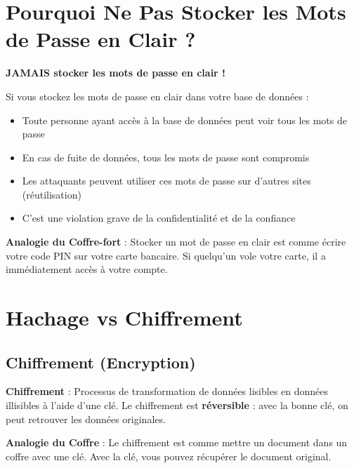 \section{Pourquoi Ne Pas Stocker les Mots de Passe en Clair ?}

\begin{errorbox}
    \textbf{JAMAIS stocker les mots de passe en clair !}
    
    Si vous stockez les mots de passe en clair dans votre base de données :
    \begin{itemize}
        \item Toute personne ayant accès à la base de données peut voir tous les mots de passe
        \item En cas de fuite de données, tous les mots de passe sont compromis
        \item Les attaquants peuvent utiliser ces mots de passe sur d'autres sites (réutilisation)
        \item C'est une violation grave de la confidentialité et de la confiance
    \end{itemize}
\end{errorbox}

\begin{analogybox}
    \textbf{Analogie du Coffre-fort} : Stocker un mot de passe en clair est comme écrire votre code PIN sur votre carte bancaire. Si quelqu'un vole votre carte, il a immédiatement accès à votre compte.
\end{analogybox}

\section{Hachage vs Chiffrement}

\subsection{Chiffrement (Encryption)}

\begin{definitionbox}
    \textbf{Chiffrement} : Processus de transformation de données lisibles en données illisibles à l'aide d'une clé. Le chiffrement est \textbf{réversible} : avec la bonne clé, on peut retrouver les données originales.
\end{definitionbox}

\begin{analogybox}
    \textbf{Analogie du Coffre} : Le chiffrement est comme mettre un document dans un coffre avec une clé. Avec la clé, vous pouvez récupérer le document original.
\end{analogybox}

